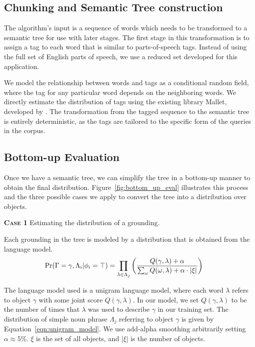 \documentclass[conference]{IEEEtran}
\numberwithin{equation}{section}
\begin{document}
\subsection{Chunking and Semantic Tree construction}
\label{sec:tagging}

The algorithm's input is a sequence of words which needs to be transformed to a semantic tree for use with later stages. The first stage in this transformation is to assign a tag to each word that is similar to parts-of-speech tags. Instead of using the full set of English parts of speech, we use a reduced set developed for this  application.

We model the relationship between words and tags as a conditional random field, where the tag for any particular word depends on the neighboring words. We directly estimate the distribution of tags using the existing library Mallet, developed by \citet{McCallumMALLET}. The transformation from the tagged sequence to the semantic tree is entirely deterministic, as the tags are tailored to the specific form of the queries in the corpus.

\subsection{Bottom-up Evaluation}
\label{sec:bottomupeval}
Once we have a semantic tree, we can simplify the tree in a bottom-up manner to obtain the final distribution. Figure~\ref{fig:bottom_up_eval} illustrates this process and the three possible cases we apply to convert the tree into a distribution over objects.

\textbf{\textsc{Case 1}} Estimating the distribution of a grounding.

Each grounding in the tree is modeled by a distribution that is obtained from the language model. 
\begin{align}
   \Pr(\Gamma = \gamma, \Lambda_i | \phi_i = \top)
& = \prod_{\lambda \in \Lambda_j} \left( \frac{Q(\gamma, \lambda) + \alpha}{\sum_{\omega} Q(\omega, \lambda) + \alpha \cdot |\xi|} \right) \label{eqn:unigram_model}
\end{align}

The language model used is a unigram language model, where each word $\lambda$ refers to object $\gamma$ with some joint score $Q(\gamma, \lambda)$. In our model, we set $Q(\gamma, \lambda)$ to be the number of times that $\lambda$ was used to describe $\gamma$ in our training set. The distribution of simple noun phrase $\Lambda_j$ referring to object $\gamma$ is given by Equation~\ref{eqn:unigram_model}. We use add-alpha smoothing arbitrarily setting $\alpha \approx 5\%$. $\xi$ is the set of all objects, and $|\xi|$ is the number of objects.
\end{document}
